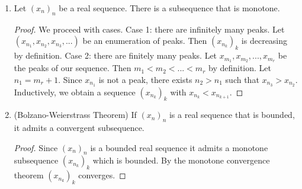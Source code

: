 \begin{enumerate}[label = (\arabic*)]
        \item Let $(x_n)_n$ be a real sequence. There is a subsequence that is monotone.
            {\color{red} \begin{proof}
                We proceed with cases. Case 1: there are infinitely many peaks. Let $(x_{n_1},x_{n_2},x_{n_3},...)$ be an enumeration of peaks. Then $(x_{n_k})_k$ is decreasing by definition. Case 2: there are finitely many peaks. Let $x_{m_1},x_{m_2},...,x_{m_r}$ be the peaks of our sequence. Then $m_1 < m_2 < ... < m_r$ by definition. Let $n_1 = m_r + 1$. Since $x_{n_1}$ is not a peak, there exists $n_2 > n_1$ such that $x_{n_3} > x_{n_2}$. Inductively, we obtain a sequence $(x_{n_k})_k$ with $x_{n_k} < x_{n_{k+1}}$.
            \end{proof}}

        \item (Bolzano-Weierstrass Theorem) If $(x_n)_n$ is a real sequence that is bounded, it admits a convergent subsequence.
            {\color{red} \begin{proof}
                Since $(x_n)_n$ is a bounded real sequence it admits a monotone subsequence $(x_{n_k})_k$ which is bounded. By the monotone convergence theorem  $(x_{n_k})_k$ converges.
            \end{proof}}


\end{enumerate}
